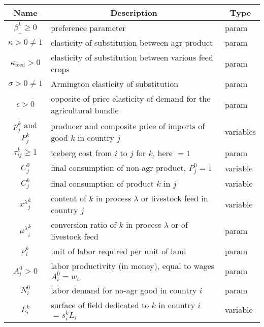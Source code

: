 \begin{tabular}{c|l|l}
\multicolumn{1}{c}{Name} & \multicolumn{1}{|c|}{Description}  & \multicolumn{1}{c}{Type} \\
\hline
    $\beta_{..}^k \ge 0$ & preference parameter & param \\

    $\kappa > 0 \neq 1$ & elasticity of substitution between agr product & param \\

    $\kappa_{\text{feed}} > 0$ & elasticity of substitution between various feed crops & param \\

    $\sigma > 0 \neq 1$ & Armington elasticity of substitution & param \\

    $\epsilon > 0$ & opposite of price elasticity of demand for the agricultural bundle & param \\

    $p_j^k$ and $P_j^k$ & producer and composite price of imports of good $k$ in country $j$ & variables \\

    $\tau_{ij}^k \ge 1$ & iceberg cost from $i$ to $j$ for $k$, here $=1$ & param \\

    $C_j^0$ & final consumption of non-agr product, $P_j^0 = 1$ & variable \\

    $C_j^k$ & final consumption of product $k$ in $j$ & variable \\

    ${{x^\lambda}_j^k}$ & content of $k$ in process $\lambda$ or livestock feed in country $j$ & variable \\

    ${{\mu^\lambda}_i^k}$ & conversion ratio of $k$ in process $\lambda$ or of livestock feed & param \\

    $\nu_i^k$ & unit of labor required per unit of land & param \\

    $A_i^0 > 0$ & labor productivity (in money), equal to wages $A_i^0 = w_i$ & param \\

    $N_i^0$ & labor demand for no-agr good in country $i$ & param\\

    $L_i^k$ & surface of field dedicated to $k$ in country $i$ $=s_i^k L_i$ & variable \\


\end{tabular}

